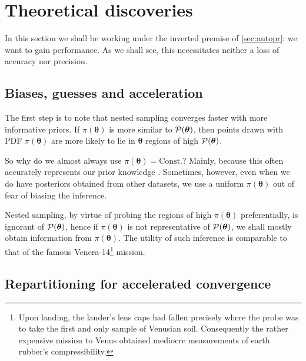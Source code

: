 \documentclass[usenatbib]{mnras}
\begin{document}
\section{Theoretical discoveries}
In this section we shall be working under the inverted premise of
\cref{sec:autopr}: we want to gain performance. As we shall see, this
necessitates neither a loss of accuracy nor precision.

\subsection{Biases, guesses and acceleration\label{discussion-bias}}
The first step is to note that nested sampling converges faster with
more informative priors. If \(\pi (\bm{\theta})\) is more similar to
\( {\cal P} (\bm{\theta})\), then points drawn with PDF
\(\pi (\bm{\theta})\) are more likely to lie in $\bm{\theta}$ regions
of high \( {\cal P} (\bm{\theta})\).

So why do we almost always use \(\pi (\bm{\theta}) = \text{Const.}\)?
Mainly, because this often accurately represents our prior knowledge
\citep{JeffreysPrior}. Sometimes, however, even when we do have
posteriors obtained from other datasets, we use a uniform
\(\pi (\bm{\theta})\) out of fear of biasing the inference.

Nested sampling, by virtue of probing the regions of high
\(\pi (\bm{\theta})\) preferentially, is ignorant of
\( {\cal P} (\bm{\theta})\), hence if \(\pi (\bm{\theta})\) is not
representative of \( {\cal P} (\bm{\theta})\), we shall mostly obtain
information from \(\pi (\bm{\theta})\). The utility of such inference
is comparable to that of the famous Venera-14\footnote{Upon landing,
  the lander's lens caps had fallen precisely where the probe was to
  take the first and only sample of Venusian soil. Consequently the
  rather expensive mission to Venus obtained mediocre measurements of
  earth rubber's compressibility.  } mission.



\subsection{Repartitioning for  accelerated convergence\label{sec:accelerating}}
\end{document}
